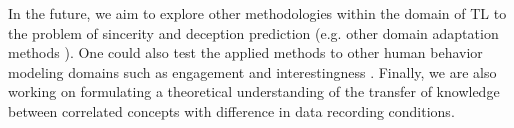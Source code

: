 \documentclass{article}
\begin{document}
In the future, we aim to explore other methodologies within the domain of TL to the problem of sincerity and deception prediction (e.g. other domain adaptation methods \cite{}).
One could also test the applied methods to other human behavior modeling domains such as engagement \cite{} and interestingness \cite{}.
Finally, we are also working on formulating a theoretical understanding of the transfer of knowledge between correlated concepts with difference in data recording conditions. 

\footnotesize{




}
\end{document}

